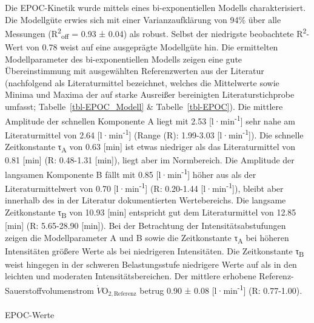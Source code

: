 \documentclass[
  letterpaper,
  DIV=11]{scrartcl}
\makeatletter
\let\oldparagraph\paragraph
\renewcommand{\paragraph}{
    \@ifstar
      \xxxParagraphStar
      \xxxParagraphNoStar
  }
\newcommand{\xxxParagraphStar}[1]{\oldparagraph*{#1}\mbox{}}
\newcommand{\xxxParagraphNoStar}[1]{\oldparagraph{#1}\mbox{}}
\makeatother
\begin{document}
Die EPOC-Kinetik wurde mittels eines bi-exponentiellen Modells
charakterisiert. Die Modellgüte erwies sich mit einer Varianzaufklärung
von 94\% über alle Messungen (R\textsuperscript{2}\textsubscript{off} =
0.93 ± 0.04) als robust. Selbst der niedrigste beobachtete
R\textsuperscript{2}-Wert von 0.78 weist auf eine ausgeprägte Modellgüte
hin. Die ermittelten Modellparameter des bi-exponentiellen Modells
zeigen eine gute Übereinstimmung mit ausgewählten Referenzwerten aus der
Literatur (nachfolgend als Literaturmittel bezeichnet, welches die
Mittelwerte sowie Minima und Maxima der auf starke Ausreißer bereinigten
Literaturstichprobe umfasst; Tabelle~\ref{tbl-EPOC_Modell} \&
Tabelle~\ref{tbl-EPOC}). Die mittlere Amplitude der schnellen Komponente
A liegt mit 2.53 {[}l·min\textsuperscript{-1}{]} sehr nahe am
Literaturmittel von 2.64 {[}l·min\textsuperscript{-1}{]} (Range (R):
1.99-3.03 {[}l·min\textsuperscript{-1}{]}). Die schnelle Zeitkonstante
τ\textsubscript{A} von 0.63 {[}min{]} ist etwas niedriger als das
Literaturmittel von 0.81 {[}min{]} (R: 0.48-1.31 {[}min{]}), liegt aber
im Normbereich. Die Amplitude der langsamen Komponente B fällt mit 0.85
{[}l·min\textsuperscript{-1}{]} höher aus als der Literaturmittelwert
von 0.70 {[}l·min\textsuperscript{-1}{]} (R: 0.20-1.44
{[}l·min\textsuperscript{-1}{]}), bleibt aber innerhalb des in der
Literatur dokumentierten Wertebereichs. Die langsame Zeitkonstante
τ\textsubscript{B} von 10.93 {[}min{]} entspricht gut dem
Literaturmittel von 12.85 {[}min{]} (R: 5.65-28.90 {[}min{]}). Bei der
Betrachtung der Intensitätsabstufungen zeigen die Modellparameter A und
B sowie die Zeitkonstante τ\textsubscript{A} bei höheren Intensitäten
größere Werte als bei niedrigeren Intensitäten. Die Zeitkonstante
τ\textsubscript{B} weist hingegen in der schweren Belastungsstufe
niedrigere Werte auf als in den leichten und moderaten
Intensitätsbereichen. Der mittlere erhobene
Referenz-Sauerstoffvolumenstrom \(\dot{V}\text{O}_{2,\text{Referenz}}\)
betrug 0.90 ± 0.08 {[}l·min\textsuperscript{-1}{]} (R: 0.77-1.00).

\paragraph{EPOC-Werte}\label{epoc-werte}
\end{document}
